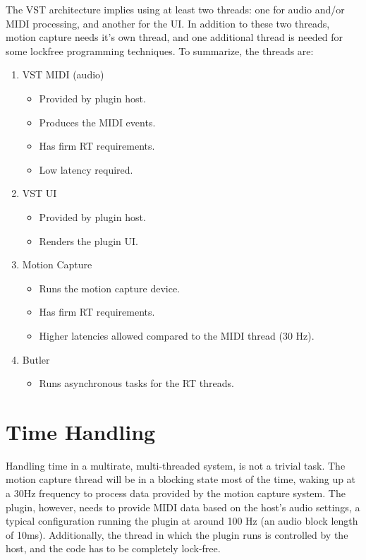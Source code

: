 The VST architecture implies using at least two threads:
one for audio and/or MIDI processing,
and another for the UI.
In addition to these two threads,
motion capture needs it's own thread,
and one additional thread is needed for some
lockfree programming techniques.
To summarize, the threads are:
\begin{enumerate}

\item VST MIDI (audio)
\begin{itemize}
\item Provided by plugin host.
\item Produces the MIDI events.
\item Has firm RT requirements.
\item Low latency required.
\end{itemize}

\item VST UI
\begin{itemize}
\item Provided by plugin host.
\item Renders the plugin UI.
\end{itemize}

\item Motion Capture
\begin{itemize}
\item Runs the motion capture device.
\item Has firm RT requirements.
\item Higher latencies allowed compared to the MIDI thread (30 Hz).
\end{itemize}

\item Butler
\begin{itemize}
\item Runs asynchronous tasks for the RT threads.
\end{itemize}

\end{enumerate}

\section{Time Handling}
\label{sec:time_handling}

Handling time in a multirate, multi-threaded system,
is not a trivial task.
The motion capture thread will be in
a blocking state most of the time,
waking up at a 30Hz frequency to process data
provided by the motion capture system.
The plugin, however, needs to provide MIDI data
based on the host's audio settings,
a typical configuration running the
plugin at around 100 Hz (an audio block length of 10ms).
Additionally, the thread in which the plugin runs
is controlled by the host,
and the code has to be completely lock-free.

